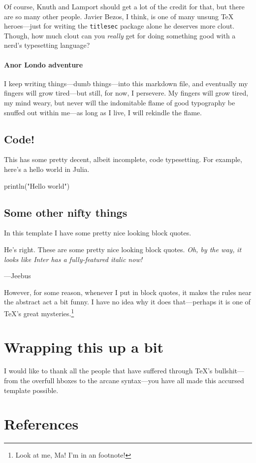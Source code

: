 \documentclass[%
	english,%
	 a4paper,%
	titlepage,%
	fleqn]{article}
\newenvironment{Shaded}{}{}
\newcommand{\FunctionTok}[1]{\textcolor[rgb]{0.02,0.16,0.49}{#1}}
\newcommand{\NormalTok}[1]{#1}
\newcommand{\StringTok}[1]{\textcolor[rgb]{0.25,0.44,0.63}{#1}}
\renewenvironment{quote}{\begin{customblockquote}\vspace{-0.5cm}{\rightmargin=0em\leftmargin=0em}%
\item\relax\color{blockquote-text}\ignorespaces}{\unskip\unskip\end{customblockquote}}
\begin{document}
Of course, Knuth and Lamport should get a lot of the credit for that,
but there are so many other people. Javier Bezos, I think, is one of
many unsung {\TeX} heroes---just for writing the \texttt{titlesec}
package alone he deserves more clout. Though, how much clout can you
\emph{really} get for doing something good with a nerd's typesetting
language?

\paragraph{Anor Londo adventure}\label{anor-londo-adventure}

I keep writing things---dumb things---into this markdown file, and
eventually my fingers will grow tired---but still, for now, I persevere.
My fingers will grow tired, my mind weary, but never will the
indomitable flame of good typography be snuffed out within me---as long
as I live, I will rekindle the flame.

\subsection{Code!}\label{code}

This has some pretty decent, albeit incomplete, code typesetting. For
example, here's a hello world in Julia.

\begin{Shaded}
\begin{Highlighting}[]
\FunctionTok{println}\NormalTok{(}\StringTok{"Hello world"}\NormalTok{)}
\end{Highlighting}
\end{Shaded}

\subsection{Some other nifty things}\label{some-other-nifty-things}

In this template I have some pretty nice looking block quotes.

\begin{quote}
He's right. These are some pretty nice looking block quotes. \emph{Oh,
by the way,} \emph{it looks like Inter has a fully-featured italic now!}

---Jeebus
\end{quote}

However, for some reason, whenever I put in block quotes, it makes the
rules near the abstract act a bit funny. I have no idea why it does
that---perhaps it is one of {\TeX}'s great mysteries.\footnote{Look at
  me, Ma! I'm in an footnote!}

\section{Wrapping this up a bit}\label{wrapping-this-up-a-bit}

\lipsum[1]

I would like to thank all the people that have suffered through {\TeX}'s
bullshit---from the overfull hboxes to the arcane syntax---you have all
made this accursed template possible.

\section{References}\label{references}
\end{document}
